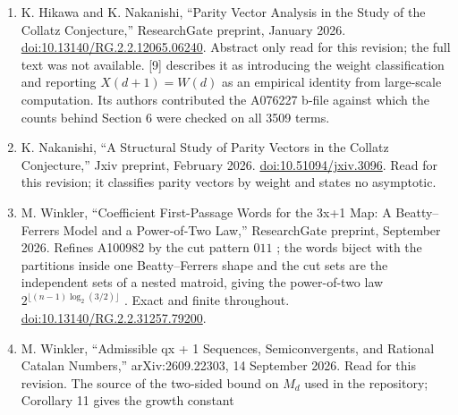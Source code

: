 \documentclass[11pt,a4paper]{article}
\begin{document}
\begin{enumerate}
  K. Hikawa, ``Finite-Dimensional Combinatorial and Arithmetic
  Structures of Parity Vectors for the Accelerated Collatz Map,''
  ResearchGate preprint, July 2026, version 2.1 of 2 August 2026.
  \href{https://doi.org/10.13140/RG.2.2.29894.84804/1}{doi:10.13140/RG.2.2.29894.84804/1}.
  Read in full for this revision, 47 pages, from the author's PDF.
  Theorem 3.3 is the bijection between surviving words of weight \(d\)
  and first-crossing words of weight \(d+1\), Theorem 5.2 the 2-adic
  rigidity within a fixed length and weight, Theorem 6.3 the logarithmic
  rate, Remark 6.5 its length-basis form, Remark 6.6 the claim that no
  asymptotic formula for either sequence was in the literature; Section
  7.3 gives Table 3, Conjecture 7.1 and the sentence on the fractional
  part of \(\lambda d\) quoted in Section 6.
\item
  K. Hikawa and K. Nakanishi, ``Parity Vector Analysis in the Study of
  the Collatz Conjecture,'' ResearchGate preprint, January 2026.
  \href{https://doi.org/10.13140/RG.2.2.12065.06240}{doi:10.13140/RG.2.2.12065.06240}.
  Abstract only read for this revision; the full text was not available.
  {[}9{]} describes it as introducing the weight classification and
  reporting \(X(d+1)=W(d)\) as an empirical identity from large-scale
  computation. Its authors contributed the A076227 b-file against which
  the counts behind Section 6 were checked on all 3509 terms.
\item
  K. Nakanishi, ``A Structural Study of Parity Vectors in the Collatz
  Conjecture,'' Jxiv preprint, February 2026.
  \href{https://doi.org/10.51094/jxiv.3096}{doi:10.51094/jxiv.3096}.
  Read for this revision; it classifies parity vectors by weight and
  states no asymptotic.
\item
  M. Winkler, ``Coefficient First-Passage Words for the 3x+1 Map: A
  Beatty--Ferrers Model and a Power-of-Two Law,'' ResearchGate preprint,
  September 2026. Refines A100982 by the cut pattern \(011\) ; the words
  biject with the partitions inside one Beatty--Ferrers shape and the
  cut sets are the independent sets of a nested matroid, giving the
  power-of-two law \(2^{\lfloor(n-1)\log_2(3/2)\rfloor}\) . Exact and
  finite throughout.
  \href{https://doi.org/10.13140/RG.2.2.31257.79200}{doi:10.13140/RG.2.2.31257.79200}.
\item
  M. Winkler, ``Admissible qx + 1 Sequences, Semiconvergents, and
  Rational Catalan Numbers,'' arXiv:2609.22303, 14 September 2026. Read
  for this revision. The source of the two-sided bound on \(M_d\) used
  in the repository; Corollary 11 gives the growth constant

\end{enumerate}
\end{document}
